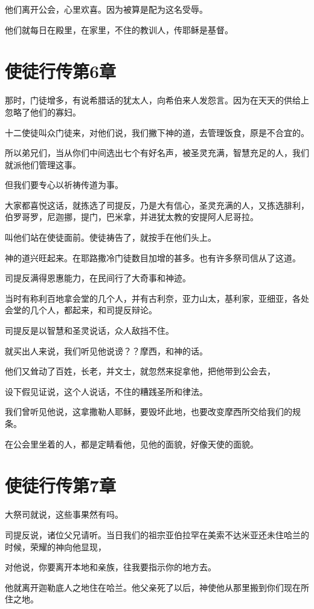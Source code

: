 \documentclass[12pt,oneside]{book}
\begin{document}
他们离开公会，心里欢喜。因为被算是配为这名受辱。

他们就每日在殿里，在家里，不住的教训人，传耶稣是基督。

\chapter{使徒行传第6章}
那时，门徒增多，有说希腊话的犹太人，向希伯来人发怨言。因为在天天的供给上忽略了他们的寡妇。

十二使徒叫众门徒来，对他们说，我们撇下神的道，去管理饭食，原是不合宜的。

所以弟兄们，当从你们中间选出七个有好名声，被圣灵充满，智慧充足的人，我们就派他们管理这事。

但我们要专心以祈祷传道为事。

大家都喜悦这话，就拣选了司提反，乃是大有信心，圣灵充满的人，又拣选腓利，伯罗哥罗，尼迦挪，提门，巴米拿，并进犹太教的安提阿人尼哥拉。

叫他们站在使徒面前。使徒祷告了，就按手在他们头上。

神的道兴旺起来。在耶路撒冷门徒数目加增的甚多。也有许多祭司信从了这道。

司提反满得恩惠能力，在民间行了大奇事和神迹。

当时有称利百地拿会堂的几个人，并有古利奈，亚力山太，基利家，亚细亚，各处会堂的几个人，都起来，和司提反辩论。

司提反是以智慧和圣灵说话，众人敌挡不住。

就买出人来说，我们听见他说谤？？摩西，和神的话。

他们又耸动了百姓，长老，并文士，就忽然来捉拿他，把他带到公会去，

设下假见证说，这个人说话，不住的糟践圣所和律法。

我们曾听见他说，这拿撒勒人耶稣，要毁坏此地，也要改变摩西所交给我们的规条。

在公会里坐着的人，都是定睛看他，见他的面貌，好像天使的面貌。

\chapter{使徒行传第7章}
大祭司就说，这些事果然有吗。

司提反说，诸位父兄请听。当日我们的祖宗亚伯拉罕在美索不达米亚还未住哈兰的时候，荣耀的神向他显现，

对他说，你要离开本地和亲族，往我要指示你的地方去。

他就离开迦勒底人之地住在哈兰。他父亲死了以后，神使他从那里搬到你们现在所住之地。
\end{document}

